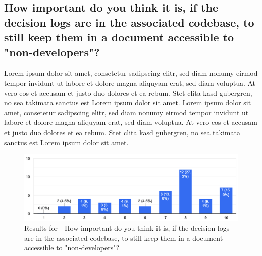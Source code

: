 \subsection{How important do you think it is, if the decision logs are in the associated codebase, to still keep them in a document accessible to "non-developers"?}
Lorem ipsum dolor sit amet, consetetur sadipscing elitr, sed diam nonumy eirmod tempor invidunt ut labore et dolore magna aliquyam erat, sed diam voluptua. At vero eos et accusam et justo duo dolores et ea rebum. Stet clita kasd gubergren, no sea takimata sanctus est Lorem ipsum dolor sit amet. Lorem ipsum dolor sit amet, consetetur sadipscing elitr, sed diam nonumy eirmod tempor invidunt ut labore et dolore magna aliquyam erat, sed diam voluptua. At vero eos et accusam et justo duo dolores et ea rebum. Stet clita kasd gubergren, no sea takimata sanctus est Lorem ipsum dolor sit amet.
\begin{figure}[h!]
\centering
\includegraphics[width=\linewidth]{Images/Survey/decisions_4.png}
\caption{Results for - How important do you think it is, if the decision logs are in the associated codebase, to still keep them in a document accessible to "non-developers"?}
\label{fig:results:decisions:4}
\end{figure}


